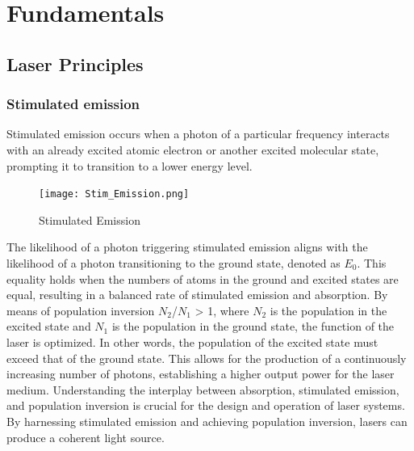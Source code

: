 \section{Fundamentals}
\label{sec:fundamentals}

\subsection{Laser Principles}
    
    \subsubsection{Stimulated emission}
    Stimulated emission occurs when a photon of a particular frequency interacts with an already excited atomic electron or another excited molecular state, prompting it to transition to a lower energy level.
   
    
    \begin{figure}
        \centering
        \texttt{[image: Stim\_Emission.png]}
        
        \caption[width = 0.1\textwidth]{ Stimulated Emission  \cite{Laser_cav} }
        \label{fig:energy_diagram}
    \end{figure}
    \noindent The likelihood of a photon triggering stimulated emission aligns with the likelihood of a photon transitioning to the ground state, denoted as $E_0$.
    This equality holds when the numbers of atoms in the ground and excited states are equal, resulting in a balanced rate of stimulated emission and absorption.
    By means of population inversion $N_2$/$N_1$ > 1, where $N_2$ is the population in the excited state and $N_1$ is the population in the ground state, the function of the laser is optimized.
    In other words, the population of the excited state must exceed that of the ground state.
    This allows for the production of a continuously increasing number of photons, establishing a higher output power for the laser medium.
    Understanding the interplay between absorption, stimulated emission, and population inversion is crucial for the design and operation of laser systems.
    By harnessing stimulated emission and achieving population inversion, lasers can produce a coherent light source. \cite{Laser_cav}

